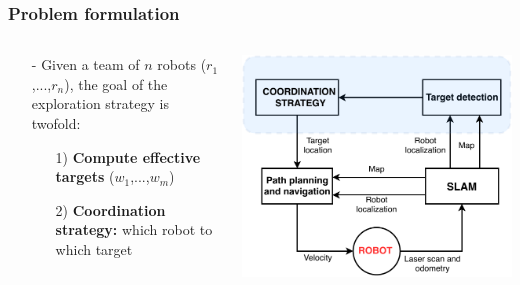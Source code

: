 \begin{frame}
	\frametitle{Problem formulation}
	\begin{columns}
		\begin{column}{0.5\textwidth}
			\begin{itemize}
				\item[-] Given a team of $n$ robots ($r_{1}$,...,$r_{n}$), the goal of the exploration	strategy is twofold:
				\begin{itemize}
					\item[1)] \textbf{Compute effective targets} ($w_{1}$,...,$w_{m}$) 
					\item[2)] \textbf{Coordination strategy:} which robot to which target 
				\end{itemize}			
			\end{itemize}
		\end{column}
		\begin{column}{0.5\textwidth}  %
			\begin{center}
				\includegraphics[width=1\textwidth]{figures/strategy_all}
				\label{fig:gauss}
			\end{center}
		\end{column}
	\end{columns}	
\end{frame}

